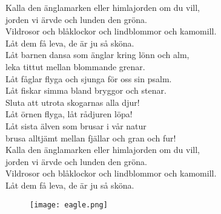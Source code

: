 \documentclass[a6paper, 10pt, twoside]{article}
\begin{document}

\noindent
\begin{center}
\end{center}
\begin{lyrics}
Kalla den änglamarken eller himlajorden om du vill,\\
jorden vi ärvde och lunden den gröna.\\
Vildrosor och blåklockor \physicalonly{\\}och lindblommor och kamomill.\\
Låt dem få leva, de är ju så sköna.
\vspace{5pt}\\
Låt barnen dansa som änglar kring lönn och alm,\\
leka tittut mellan blommande grenar.\\
Låt fåglar flyga och sjunga för oss sin psalm.\\
Låt fiskar simma bland bryggor och stenar.
\vspace{5pt}\\
Sluta att utrota skogarnas alla djur!\\
Låt örnen flyga, låt rådjuren löpa!\\
Låt sista älven som brusar i vår natur\\
brusa alltjämt mellan fjällar och gran och fur!
\vspace{5pt}\\
Kalla den änglamarken eller himlajorden om du vill,\\
jorden vi ärvde och lunden den gröna.\\
Vildrosor och blåklockor \physicalonly{\\}och lindblommor och kamomill.\\
Låt dem få leva, de är ju så sköna.
\end{lyrics}
\begin{figure}[!h]
\centering
\texttt{[image: eagle.png]}
\end{figure}
\end{document}

